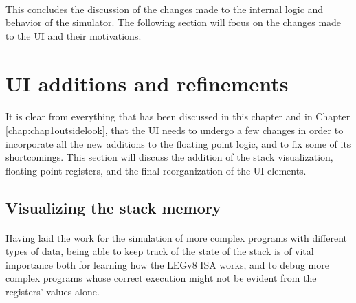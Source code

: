 \paragraph{}
This concludes the discussion of the changes made to the internal logic and behavior of the simulator. The following section will focus on the changes made to the UI and their motivations.

\section{UI additions and refinements}\label{chap:chap4UI}
\paragraph{}
It is clear from everything that has been discussed in this chapter and in Chapter \ref{chap:chap1outsidelook}, that the UI needs to undergo a few changes in order to incorporate all the new additions to the floating point logic, and to fix some of its shortcomings. This section will discuss the addition of the stack visualization, floating point registers, and the final reorganization of the UI elements.
\subsection{Visualizing the stack memory}
\paragraph{}
Having laid the work for the simulation of more complex programs with different types of data, being able to keep track of the state of the stack is of vital importance both for learning how the LEGv8 ISA works, and to debug more complex programs whose correct execution might not be evident from the registers' values alone.
